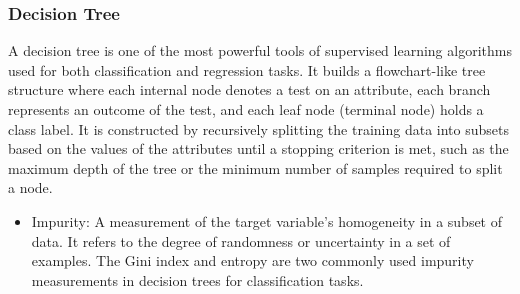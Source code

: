 \subsubsection{Decision Tree}
A decision tree is one of the most powerful tools of supervised learning algorithms used for both classification and regression tasks. It builds a flowchart-like tree structure where each internal node denotes a test on an attribute, each branch represents an outcome of the test, and each leaf node (terminal node) holds a class label. It is constructed by recursively splitting the training data into subsets based on the values of the attributes until a stopping criterion is met, such as the maximum depth of the tree or the minimum number of samples required to split a node\cite{geeksforgeeks_2017}.

\begin{itemize}
\item Impurity: A measurement of the target variable’s homogeneity in a subset of data. It refers to the degree of randomness or uncertainty in a set of examples. The Gini index and entropy are two commonly used impurity measurements in decision trees for classification tasks.
\end{itemize}

